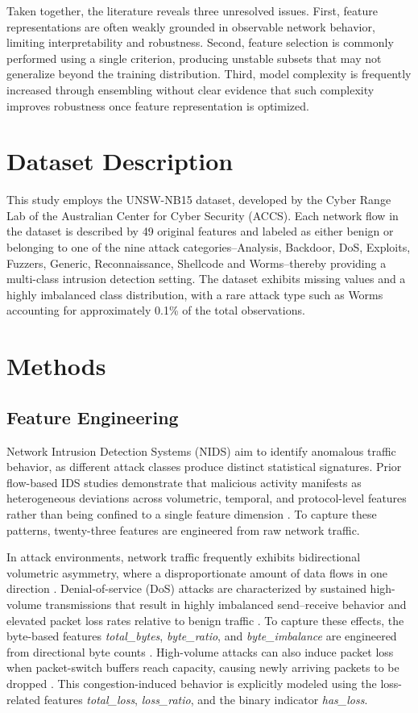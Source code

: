\documentclass[pdflatex,sn-mathphys-num]{sn-jnl}
\theoremstyle{thmstyleone}%
\theoremstyle{thmstyletwo}%
\theoremstyle{thmstylethree}%
\begin{document}
Taken together, the literature reveals three unresolved issues. First, feature representations are often weakly grounded in observable network behavior, limiting interpretability and robustness. Second, feature selection is commonly performed using a single criterion, producing unstable subsets that may not generalize beyond the training distribution. Third, model complexity is frequently increased through ensembling without clear evidence that such complexity improves robustness once feature representation is optimized.

\section{Dataset Description}
This study employs the UNSW-NB15 dataset, developed by the Cyber Range Lab of the Australian Center for Cyber Security (ACCS). Each network flow in the dataset is described by 49 original features and labeled as either benign or belonging to one of the nine attack categories–Analysis, Backdoor, DoS, Exploits, Fuzzers, Generic, Reconnaissance, Shellcode and Worms–thereby  providing a multi-class intrusion detection setting. The dataset exhibits missing values and a highly imbalanced class distribution, with a rare attack type such as Worms accounting for approximately 0.1\% of the total observations.

\section{Methods}\label{Methods}
\subsection{Feature Engineering}
Network Intrusion Detection Systems (NIDS) aim to identify anomalous traffic behavior, as different attack classes produce distinct statistical signatures. Prior flow-based IDS studies demonstrate that malicious activity manifests as heterogeneous deviations across volumetric, temporal, and protocol-level features rather than being confined to a single feature dimension \cite{KIFLAY2024100349, luay2025temporalanalysisnetflowdatasets}. To capture these patterns, twenty-three features are engineered from raw network traffic.

In attack environments, network traffic frequently exhibits bidirectional volumetric asymmetry, where a disproportionate amount of data flows in one direction \cite{Sharafaldin2018}. Denial-of-service (DoS) attacks are characterized by sustained high-volume transmissions that result in highly imbalanced send–receive behavior and elevated packet loss rates relative to benign traffic \cite{SOMANI201730}. To capture these effects, the byte-based features \textit{total\_bytes}, \textit{byte\_ratio}, and \textit{byte\_imbalance} are engineered from directional byte counts \cite{MoustafaSlay2015, MoustafaSlay2016Eval}. High-volume attacks can also induce packet loss when packet-switch buffers reach capacity, causing newly arriving packets to be dropped \cite{Alizadeh2010}. This congestion-induced behavior is explicitly modeled using the loss-related features \textit{total\_loss}, \textit{loss\_ratio}, and the binary indicator \textit{has\_loss}.
\end{document}
